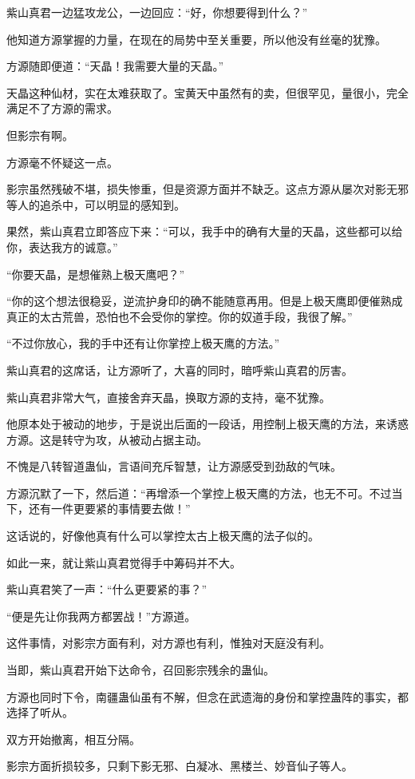 \begin{this_body}
紫山真君一边猛攻龙公，一边回应：“好，你想要得到什么？”

他知道方源掌握的力量，在现在的局势中至关重要，所以他没有丝毫的犹豫。

方源随即便道：“天晶！我需要大量的天晶。”

天晶这种仙材，实在太难获取了。宝黄天中虽然有的卖，但很罕见，量很小，完全满足不了方源的需求。

但影宗有啊。

方源毫不怀疑这一点。

影宗虽然残破不堪，损失惨重，但是资源方面并不缺乏。这点方源从屡次对影无邪等人的追杀中，可以明显的感知到。

果然，紫山真君立即答应下来：“可以，我手中的确有大量的天晶，这些都可以给你，表达我方的诚意。”

“你要天晶，是想催熟上极天鹰吧？”

“你的这个想法很稳妥，逆流护身印的确不能随意再用。但是上极天鹰即便催熟成真正的太古荒兽，恐怕也不会受你的掌控。你的奴道手段，我很了解。”

“不过你放心，我的手中还有让你掌控上极天鹰的方法。”

紫山真君的这席话，让方源听了，大喜的同时，暗呼紫山真君的厉害。

紫山真君非常大气，直接舍弃天晶，换取方源的支持，毫不犹豫。

他原本处于被动的地步，于是说出后面的一段话，用控制上极天鹰的方法，来诱惑方源。这是转守为攻，从被动占据主动。

不愧是八转智道蛊仙，言语间充斥智慧，让方源感受到劲敌的气味。

方源沉默了一下，然后道：“再增添一个掌控上极天鹰的方法，也无不可。不过当下，还有一件更要紧的事情要去做！”

这话说的，好像他真有什么可以掌控太古上极天鹰的法子似的。

如此一来，就让紫山真君觉得手中筹码并不大。

紫山真君笑了一声：“什么更要紧的事？”

“便是先让你我两方都罢战！”方源道。

这件事情，对影宗方面有利，对方源也有利，惟独对天庭没有利。

当即，紫山真君开始下达命令，召回影宗残余的蛊仙。

方源也同时下令，南疆蛊仙虽有不解，但念在武遗海的身份和掌控蛊阵的事实，都选择了听从。

双方开始撤离，相互分隔。

影宗方面折损较多，只剩下影无邪、白凝冰、黑楼兰、妙音仙子等人。


\end{this_body}
